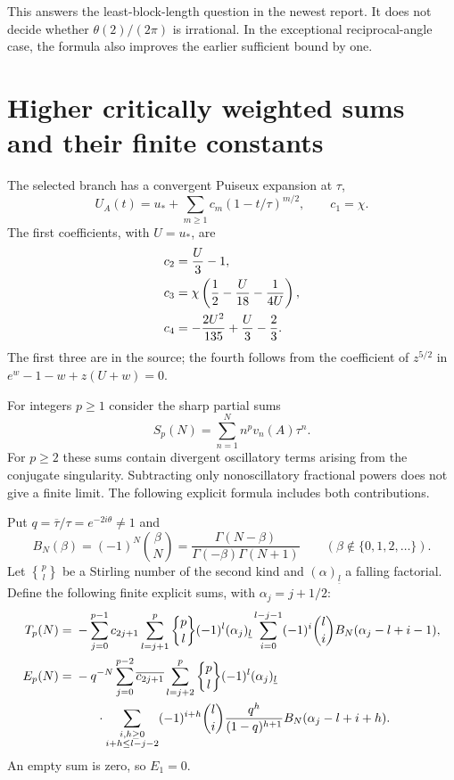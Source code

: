 \documentclass[11pt,a4paper]{article}
\numberwithin{equation}{section}
\theoremstyle{definition}
\theoremstyle{remark}
\begin{document}
This answers the least-block-length question in the newest report.
It does not decide whether $\theta(2)/(2\pi)$ is irrational.
In the exceptional reciprocal-angle case, the formula also improves
the earlier sufficient bound by one.

\section{Higher critically weighted sums and their finite constants}
\label{newdiag:sec:finiteparts}

The selected branch has a convergent Puiseux expansion at $\tau$,
\begin{equation}\label{newdiag:eq:puiseux}
 U_A(t)=u_*+\sum_{m\geq1}c_m(1-t/\tau)^{m/2},
 \qquad c_1=\chi.
\end{equation}
The first coefficients, with $U=u_*$, are
\begin{align}
 c_2&=\frac U3-1,\notag\\
 c_3&=\chi\left(\frac12-\frac U{18}-\frac1{4U}\right),\label{newdiag:eq:c1234}\\
 c_4&=-\frac{2U^2}{135}+\frac U3-\frac23.\notag
\end{align}
The first three are in the source; the fourth follows from the
coefficient of $z^{5/2}$ in
$e^w-1-w+z(U+w)=0$.

For integers $p\geq1$ consider the sharp partial sums
\[
 S_p(N)=\sum_{n=1}^N n^p v_n(A)\tau^n.
\]
For $p\geq2$ these sums contain divergent oscillatory terms arising
from the conjugate singularity.  Subtracting only nonoscillatory
fractional powers does not give a finite limit.  The following
explicit formula includes both contributions.

Put $q=\overline\tau/\tau=e^{-2i\theta}\ne1$ and
\[
 B_N(\beta)=(-1)^N\binom\beta N
     =\frac{\Gamma(N-\beta)}{\Gamma(-\beta)\Gamma(N+1)}
       \qquad(\beta\notin\{0,1,2,\ldots\}).
\]
Let $\genfrac{\{}{\}}{0pt}{}{p}{l}$ be a Stirling number of the second
kind and $(\alpha)_{\underline l}$ a falling factorial.  Define the
following finite explicit sums, with $\alpha_j=j+1/2$:
\begin{align}
 T_p(N)={}&-\sum_{j=0}^{p-1}c_{2j+1}
   \sum_{l=j+1}^{p}\genfrac{\{}{\}}{0pt}{}{p}{l}
       (-1)^l(\alpha_j)_{\underline l}
   \sum_{i=0}^{l-j-1}(-1)^i\binom li
       B_N(\alpha_j-l+i-1),\label{newdiag:eq:T}\\
 E_p(N)={}&-q^{-N}\sum_{j=0}^{p-2}\overline{c_{2j+1}}
   \sum_{l=j+2}^{p}\genfrac{\{}{\}}{0pt}{}{p}{l}
       (-1)^l(\alpha_j)_{\underline l}\notag\\
 &\hspace{6mm}\cdot
   \sum_{\substack{i,h\geq0\\i+h\leq l-j-2}}
       (-1)^{i+h}\binom li\frac{q^h}{(1-q)^{h+1}}
       B_N(\alpha_j-l+i+h).
       \label{newdiag:eq:E}
\end{align}
An empty sum is zero, so $E_1=0$.
\end{document}
